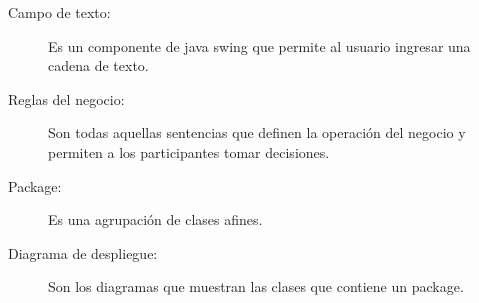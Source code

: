 \begin{description}
	\item[Campo de texto:] Es un componente de java swing que permite al usuario ingresar una cadena de texto.
\end{description}

\begin{description}
	\item[Reglas del negocio:] Son todas aquellas sentencias que definen la operación del negocio y permiten a los participantes tomar decisiones.
\end{description}

\begin{description}
	\item[Package:] Es una agrupación de clases afines.
\end{description}

\begin{description}
	\item[Diagrama de despliegue:] Son los diagramas que muestran las clases que contiene un package.
\end{description}